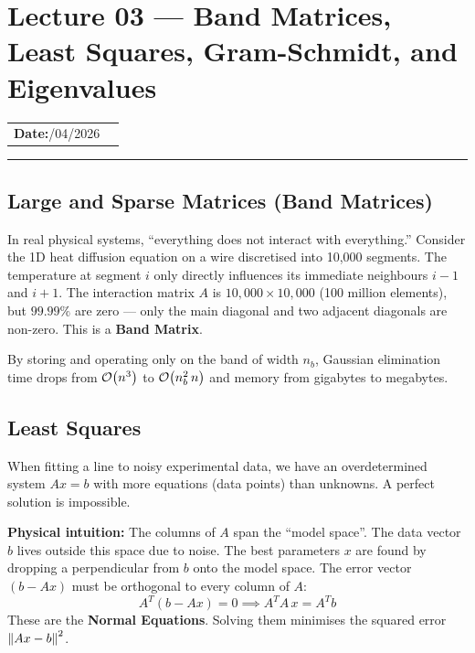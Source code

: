 
\section{Lecture 03 — Band Matrices, Least Squares, Gram-Schmidt, and
  Eigenvalues}\label{sec:lec03}

\begin{center}
\begin{tabular}{ll}
  \textbf{Date:}\quad 23/04/2026 & \\
\end{tabular}
\end{center}
\hrule\vspace{1.5em}

\subsection{Large and Sparse Matrices (Band Matrices)}
In real physical systems, ``everything does not interact with everything.''
Consider the 1D heat diffusion equation on a wire discretised into 10,000
segments. The temperature at segment $i$ only directly influences its
immediate neighbours $i-1$ and $i+1$. The interaction matrix $A$ is
$10{,}000 \times 10{,}000$ (100 million elements), but $99.99\%$ are zero —
only the main diagonal and two adjacent diagonals are non-zero. This is a
\textbf{Band Matrix}.

By storing and operating only on the band of width $n_b$, Gaussian
elimination time drops from $\mathcal{O}\!\left(n^3\right)$ to $\mathcal{O}\!\left(n_b^2\, n\right)$ and memory
from gigabytes to megabytes.

\subsection{Least Squares}
When fitting a line to noisy experimental data, we have an overdetermined
system $Ax = b$ with more equations (data points) than unknowns. A perfect
solution is impossible.

\noindent\textbf{Physical intuition:} The columns of $A$ span the ``model
space''. The data vector $b$ lives outside this space due to noise. The best
parameters $x$ are found by dropping a perpendicular from $b$ onto the model
space. The error vector $(b - Ax)$ must be orthogonal to every column of $A$:
\[
A^T(b - Ax) = 0 \implies \boxed{A^T A\, x = A^T b}
\]
These are the \textbf{Normal Equations}. Solving them minimises the squared
error $\left\lVert Ax - b\right\rVert^2$.

